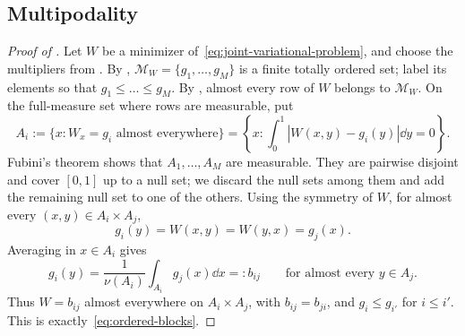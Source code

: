 \subsection{Multipodality}\label{sec:row-multipodality}

\begin{proof}[Proof of ]
Let $W$ be a minimizer of~\eqref{eq:joint-variational-problem}, and choose
the multipliers from .
By ,
$\mathcal M_W=\{g_1,\dots,g_M\}$ is a finite totally ordered set; label its
elements so that $g_1\le\dots\le g_M$.  By
, almost every row of $W$ belongs to
$\mathcal M_W$.  On the full-measure set where rows are measurable, put
\[
  A_i:=\{x:W_x=g_i\text{ almost everywhere}\}
      =\left\{x:\int_0^1|W(x,y)-g_i(y)|\dd y=0\right\}.
\]
Fubini's theorem shows that $A_1,\dots,A_M$ are measurable.  They are pairwise
disjoint and cover $[0,1]$ up to a null set; we discard
the null sets among them and add the remaining null set to one of the others.
Using the symmetry of $W$, for almost every $(x,y)\in A_i\times A_j$,
\[
  g_i(y)=W(x,y)=W(y,x)=g_j(x).
\]
Averaging in $x\in A_i$ gives
\[
  g_i(y)=\frac1{\nu(A_i)}\int_{A_i}g_j(x)\dd x=:b_{ij}
  \qquad\text{for almost every }y\in A_j.
\]
Thus $W=b_{ij}$ almost everywhere on $A_i\times A_j$,
with $b_{ij}=b_{ji}$, and $g_i\le g_{i'}$ for $i\le i'$.
This is exactly~\eqref{eq:ordered-blocks}.
\end{proof}
